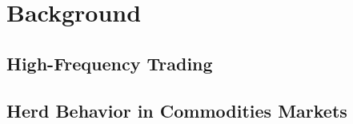 \section{Background}
\label{background}

\subsection{High-Frequency Trading}

\subsection{Herd Behavior in Commodities Markets}

